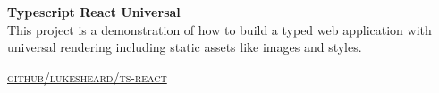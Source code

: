
{\raggedright
  \textbf{Typescript React Universal}
  \\

  This project is a demonstration of how to build a typed web application with universal rendering including static assets like images and styles.

  \textsc{\small\href{http://github.com/LukeSheard/typescript-universal-boilerplate-react}{github/lukesheard/ts-react}}
} \\
